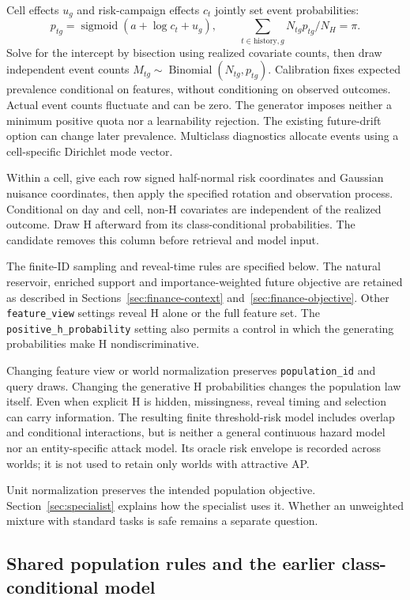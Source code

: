 \documentclass[11pt]{article}
\begin{document}
Cell effects $u_g$ and risk-campaign effects $c_t$ jointly set event probabilities:
\[
 p_{tg}=\operatorname{sigmoid}(a+\log c_t+u_g),\qquad
 \sum_{t\in\mathrm{history},g}N_{tg}p_{tg}/N_H=\pi.
\]
Solve for the intercept by bisection using realized covariate counts, then draw independent event counts $M_{tg}\sim\operatorname{Binomial}(N_{tg},p_{tg})$. Calibration fixes expected prevalence conditional on features, without conditioning on observed outcomes. Actual event counts fluctuate and can be zero. The generator imposes neither a minimum positive quota nor a learnability rejection. The existing future-drift option can change later prevalence. Multiclass diagnostics allocate events using a cell-specific Dirichlet mode vector.

Within a cell, give each row signed half-normal risk coordinates and Gaussian nuisance coordinates, then apply the specified rotation and observation process. Conditional on day and cell, non-H covariates are independent of the realized outcome. Draw H afterward from its class-conditional probabilities. The candidate removes this column before retrieval and model input.

The finite-ID sampling and reveal-time rules are specified below. The natural reservoir, enriched support and importance-weighted future objective are retained as described in Sections~\ref{sec:finance-context} and~\ref{sec:finance-objective}. Other \texttt{feature\_view} settings reveal H alone or the full feature set. The \texttt{positive\_h\_probability} setting also permits a control in which the generating probabilities make H nondiscriminative.

Changing feature view or world normalization preserves \texttt{population\_id} and query draws. Changing the generative H probabilities changes the population law itself. Even when explicit H is hidden, missingness, reveal timing and selection can carry information. The resulting finite threshold-risk model includes overlap and conditional interactions, but is neither a general continuous hazard model nor an entity-specific attack model. Its oracle risk envelope is recorded across worlds; it is not used to retain only worlds with attractive AP.

Unit normalization preserves the intended population objective. Section~\ref{sec:specialist} explains how the specialist uses it. Whether an unweighted mixture with standard tasks is safe remains a separate question.

\subsection{Shared population rules and the earlier class-conditional model}
\end{document}
